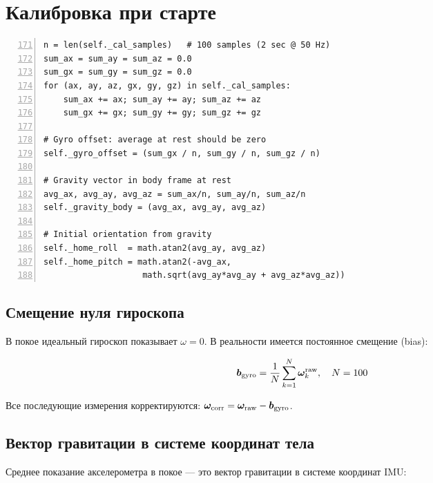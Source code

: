 \section{Калибровка при старте}

\begin{filebox}[title={\filepath{imu\_node.py}, строки 169--212 --- \_finish\_calibration()}]
\begin{lstlisting}[style=pythonstyle, numbers=left, firstnumber=171]
n = len(self._cal_samples)   # 100 samples (2 sec @ 50 Hz)
sum_ax = sum_ay = sum_az = 0.0
sum_gx = sum_gy = sum_gz = 0.0
for (ax, ay, az, gx, gy, gz) in self._cal_samples:
    sum_ax += ax; sum_ay += ay; sum_az += az
    sum_gx += gx; sum_gy += gy; sum_gz += gz

# Gyro offset: average at rest should be zero
self._gyro_offset = (sum_gx / n, sum_gy / n, sum_gz / n)

# Gravity vector in body frame at rest
avg_ax, avg_ay, avg_az = sum_ax/n, sum_ay/n, sum_az/n
self._gravity_body = (avg_ax, avg_ay, avg_az)

# Initial orientation from gravity
self._home_roll  = math.atan2(avg_ay, avg_az)
self._home_pitch = math.atan2(-avg_ax,
                    math.sqrt(avg_ay*avg_ay + avg_az*avg_az))
\end{lstlisting}
\end{filebox}

\subsection{Смещение нуля гироскопа}

В покое идеальный гироскоп показывает $\omega = 0$. В реальности
имеется постоянное смещение (bias):

\begin{equation}
  \bm{b}_{\text{gyro}} = \frac{1}{N}\sum_{k=1}^{N} \bm{\omega}_k^{\text{raw}}, \quad N = 100
  \label{eq:gyro_bias}
\end{equation}

Все последующие измерения корректируются:
$\bm{\omega}_{\text{corr}} = \bm{\omega}_{\text{raw}} - \bm{b}_{\text{gyro}}$.

\subsection{Вектор гравитации в системе координат тела}

Среднее показание акселерометра в покое --- это вектор гравитации
в системе координат IMU:

